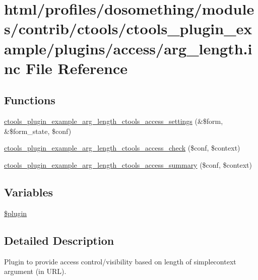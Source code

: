 \hypertarget{arg__length_8inc}{
\section{html/profiles/dosomething/modules/contrib/ctools/ctools\_\-plugin\_\-example/plugins/access/arg\_\-length.inc File Reference}
\label{arg__length_8inc}
}
\subsection*{Functions}
\begin{DoxyCompactItemize}
\item 
\hyperlink{arg__length_8inc_aa4f475dae1cabad0800cc09be5deddb5}{ctools\_\-plugin\_\-example\_\-arg\_\-length\_\-ctools\_\-access\_\-settings} (\&\$form, \&\$form\_\-state, \$conf)
\item 
\hyperlink{arg__length_8inc_a2ac3b285c0ba4bace83b4fb1c28cb37b}{ctools\_\-plugin\_\-example\_\-arg\_\-length\_\-ctools\_\-access\_\-check} (\$conf, \$context)
\item 
\hyperlink{arg__length_8inc_a80fd33c8b7d9dac56dbc9c6a5230d67d}{ctools\_\-plugin\_\-example\_\-arg\_\-length\_\-ctools\_\-access\_\-summary} (\$conf, \$context)
\end{DoxyCompactItemize}
\subsection*{Variables}
\begin{DoxyCompactItemize}
\item 
\hyperlink{arg__length_8inc_ada8a7130088351710bb02ed622d6bf65}{\$plugin}
\end{DoxyCompactItemize}


\subsection{Detailed Description}
Plugin to provide access control/visibility based on length of simplecontext argument (in URL). 

